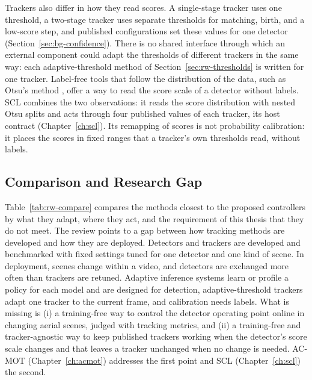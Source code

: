 Trackers also differ in how they read scores. A single-stage tracker uses one threshold, a two-stage tracker uses separate thresholds for matching, birth, and a low-score step, and published configurations set these values for one detector (Section~\ref{sec:bg-confidence}). There is no shared interface through which an external component could adapt the thresholds of different trackers in the same way: each adaptive-threshold method of Section~\ref{sec:rw-thresholds} is written for one tracker. Label-free tools that follow the distribution of the data, such as Otsu's method \cite{goh2018otsu}, offer a way to read the score scale of a detector without labels. SCL combines the two observations: it reads the score distribution with nested Otsu splits and acts through four published values of each tracker, its host contract (Chapter~\ref{ch:scl}). Its remapping of scores is not probability calibration: it places the scores in fixed ranges that a tracker's own thresholds read, without labels.

\subsection{Comparison and Research Gap}\label{sec:rw-gap}
Table~\ref{tab:rw-compare} compares the methods closest to the proposed controllers by what they adapt, where they act, and the requirement of this thesis that they do not meet. The review points to a gap between how tracking methods are developed and how they are deployed. Detectors and trackers are developed and benchmarked with fixed settings tuned for one detector and one kind of scene. In deployment, scenes change within a video, and detectors are exchanged more often than trackers are retuned. Adaptive inference systems learn or profile a policy for each model and are designed for detection, adaptive-threshold trackers adapt one tracker to the current frame, and calibration needs labels. What is missing is (i) a training-free way to control the detector operating point online in changing aerial scenes, judged with tracking metrics, and (ii) a training-free and tracker-agnostic way to keep published trackers working when the detector's score scale changes and that leaves a tracker unchanged when no change is needed. AC-MOT (Chapter~\ref{ch:acmot}) addresses the first point and SCL (Chapter~\ref{ch:scl}) the second.


